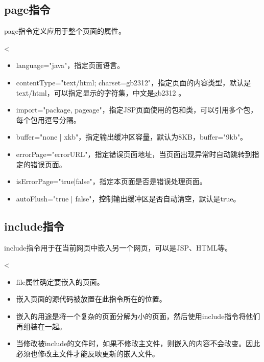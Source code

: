 \subsection{page指令}
page指令定义应用于整个页面的属性。


\begin{jspCode}
  <%
\end{jspCode}


\begin{itemize}
\item language="java"，指定页面语言。
\item contentType="text/html; charset=gb2312"，指定页面的内容类型，默认是text/html，可以指定显示的字符集，中文是gb2312 。
\item import="package, pageage"，指定JSP页面使用的包和类，可以引用多个包，每个包用逗号分隔。
\item buffer="none | xkb"，指定输出缓冲区容量，默认为8KB，buffer="9kb"。
\item errorPage="errorURL"，指定错误页面地址，当页面出现异常时自动跳转到指定的错误页面。
\item isErrorPage="true|false"，指定本页面是否是错误处理页面。
\item autoFlush="true | false"，控制输出缓冲区是否自动清空，默认是true。
\end{itemize}

\subsection{include指令}

include指令用于在当前网页中嵌入另一个网页，可以是JSP、HTML等。


\begin{jspCode}
  <%
\end{jspCode}


\begin{itemize}
\item file属性确定要嵌入的页面。
\item 嵌入页面的源代码被放置在此指令所在的位置。
\item 嵌入的用途是将一个复杂的页面分解为小的页面，然后使用include指令将他们再组装在一起。
\item {\Red 当修改被include的文件时，如果不修改主文件，则嵌入的内容不会改变。因此必须也修改主文件才能反映更新的嵌入文件。}
\end{itemize}

